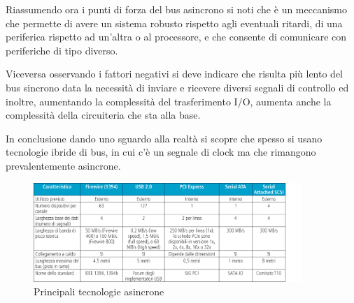 \documentclass[class=book, crop=false, oneside]{standalone}
\begin{document}
Riassumendo ora i punti di forza del bus asincrono si noti che è un meccanismo che permette di avere un sistema robusto rispetto agli eventuali ritardi, di una periferica rispetto ad un'altra o al processore, e che consente di comunicare con periferiche di tipo diverso.

Viceversa osservando i fattori negativi si deve indicare che risulta più lento del bus sincrono data la necessità di inviare e ricevere diversi segnali di controllo ed inoltre, aumentando la complessità del trasferimento I/O, aumenta anche la complessità della circuiteria che sta alla base.

In conclusione dando uno sguardo alla realtà si scopre che spesso si usano tecnologie ibride di bus, in cui c’è un segnale di clock ma che rimangono prevalentemente asincrone.

\begin{figure}[!h]
	\centering
	\includegraphics[width=0.9\textwidth,keepaspectratio]{tecnologie-asincrone}
	\caption{Principali tecnologie asincrone}
\end{figure}
\end{document}
